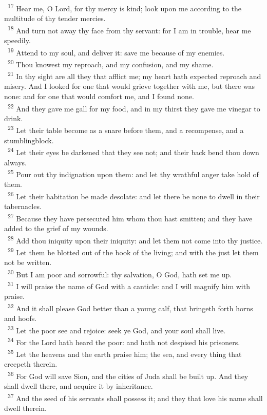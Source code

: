 \documentclass[a5paper,12pt]{article}
\begin{document}
\begin{multicols*}{2}
~\textsuperscript{17} Hear me, O Lord, for thy mercy is kind; look upon me according to the multitude of thy tender mercies.\\
~\textsuperscript{18} And turn not away thy face from thy servant: for I am in trouble, hear me speedily.\\
~\textsuperscript{19} Attend to my soul, and deliver it: save me because of my enemies.\\
~\textsuperscript{20} Thou knowest my reproach, and my confusion, and my shame.\\
~\textsuperscript{21} In thy sight are all they that afflict me; my heart hath expected reproach and misery. And I looked for one that would grieve together with me, but there was none: and for one that would comfort me, and I found none.\\
~\textsuperscript{22} And they gave me gall for my food, and in my thirst they gave me vinegar to drink.\\
~\textsuperscript{23} Let their table become as a snare before them, and a recompense, and a stumblingblock.\\
~\textsuperscript{24} Let their eyes be darkened that they see not; and their back bend thou down always.\\
~\textsuperscript{25} Pour out thy indignation upon them: and let thy wrathful anger take hold of them.\\
~\textsuperscript{26} Let their habitation be made desolate: and let there be none to dwell in their tabernacles.\\
~\textsuperscript{27} Because they have persecuted him whom thou hast smitten; and they have added to the grief of my wounds.\\
~\textsuperscript{28} Add thou iniquity upon their iniquity: and let them not come into thy justice.\\
~\textsuperscript{29} Let them be blotted out of the book of the living; and with the just let them not be written.\\
~\textsuperscript{30} But I am poor and sorrowful: thy salvation, O God, hath set me up.\\
~\textsuperscript{31} I will praise the name of God with a canticle: and I will magnify him with praise.\\
~\textsuperscript{32} And it shall please God better than a young calf, that bringeth forth horns and hoofs.\\
~\textsuperscript{33} Let the poor see and rejoice: seek ye God, and your soul shall live.\\
~\textsuperscript{34} For the Lord hath heard the poor: and hath not despised his prisoners.\\
~\textsuperscript{35} Let the heavens and the earth praise him; the sea, and every thing that creepeth therein.\\
~\textsuperscript{36} For God will save Sion, and the cities of Juda shall be built up. And they shall dwell there, and acquire it by inheritance.\\
~\textsuperscript{37} And the seed of his servants shall possess it; and they that love his name shall dwell therein.\\


\end{multicols*}
\end{document}
